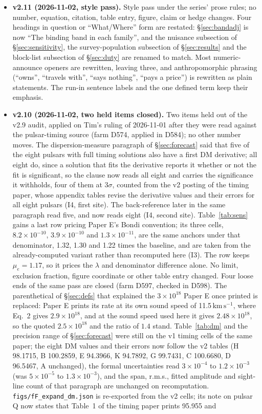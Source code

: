 \documentclass[11pt]{article}
\begin{document}
\begin{itemize}
\item \textbf{v2.11 (2026-11-02, style pass).} Style pass under the series' prose rules; no number, equation, citation, table entry, figure, claim or hedge changes. Four headings in question or ``What/Where'' form are restated: \S\ref{sec:bandadj} is now ``The binding band in each family'', and the nuisance subsection of \S\ref{sec:sensitivity}, the survey-population subsection of \S\ref{sec:results} and the block-list subsection of \S\ref{sec:duty} are renamed to match. Most numeric-announce openers are rewritten, leaving three, and anthropomorphic phrasing (``owns'', ``travels with'', ``says nothing'', ``pays a price'') is rewritten as plain statements. The run-in sentence labels and the one defined term keep their emphasis.
\item \textbf{v2.10 (2026-11-02, two held items closed).} Two items held out of the v2.9 audit, applied on Tim's ruling of 2026-11-01 after they were read against the pulsar-timing source (farm D574, applied in D584); no other number moves. The dispersion-measure paragraph of \S\ref{sec:forecast} said that five of the eight pulsars with full timing solutions also have a first DM derivative; all eight do, since a solution that fits the derivative reports it whether or not the fit is significant, so the clause now reads all eight and carries the significance it withholds, four of them at $3\sigma$, counted from the v2 posting of the timing paper, whose appendix tables revise the derivative values and their errors for all eight pulsars (I4, first site). The back-reference later in the same paragraph read five, and now reads eight (I4, second site). Table~\ref{tab:sens} gains a last row pricing Paper E's Bondi convention; its three cells, $8.2\times10^{-10}$, $3.9\times10^{-10}$ and $1.3\times10^{-11}$, are the same anchors under that denominator, 1.32, 1.30 and 1.22 times the baseline, and are taken from the already-computed variant rather than recomputed here (I3). The row keeps $\mu_{e} = 1.17$, so it prices the $\lambda$ and denominator difference alone. No limit, exclusion fraction, figure coordinate or other table entry changed. Four loose ends of the same pass are closed (farm D597, checked in D598). The parenthetical of \S\ref{sec:defs} that explained the $3\times10^{18}$ Paper E once printed is replaced: Paper E prints its rate at its own sound speed of 11.5\,$\mathrm{km\,s^{-1}}$, where Eq.~2 gives $2.9\times10^{18}$, and at the sound speed used here it gives $2.48\times10^{18}$, so the quoted $2.5\times10^{18}$ and the ratio of $1.4$ stand. Table~\ref{tab:dm} and the precision range of \S\ref{sec:forecast} were still on the v1 timing cells of the same paper; the eight DM values and their errors now follow the v2 tables (H 98.1715, B 100.2859, E 94.3966, K 94.7892, G 99.7431, C 100.6680, D 96.5467, A unchanged), the formal uncertainties read $3\times10^{-4}$ to $1.2\times10^{-3}$ (was $5\times10^{-5}$ to $1.3\times10^{-3}$), and the span, r.m.s., fitted amplitude and sight-line count of that paragraph are unchanged on recomputation. \texttt{figs/fF\_expand\_dm.json} is re-exported from the v2 cells; its note on pulsar Q now states that Table~1 of the timing paper prints 95.955 and 
\end{itemize}
\end{document}
